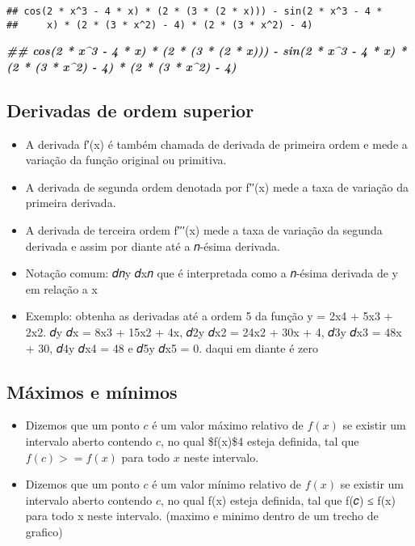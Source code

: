 \documentclass[
]{article}
\newenvironment{Shaded}{\begin{snugshade}}{\end{snugshade}}
\newcommand{\DocumentationTok}[1]{\textcolor[rgb]{0.56,0.35,0.01}{\textbf{\textit{#1}}}}
\providecommand{\tightlist}{%
  \setlength{\itemsep}{0pt}\setlength{\parskip}{0pt}}
\begin{document}
\begin{verbatim}
## cos(2 * x^3 - 4 * x) * (2 * (3 * (2 * x))) - sin(2 * x^3 - 4 * 
##     x) * (2 * (3 * x^2) - 4) * (2 * (3 * x^2) - 4)
\end{verbatim}

\begin{Shaded}
\begin{Highlighting}[]
\DocumentationTok{\#\# cos(2 * x\^{}3 {-} 4 * x) * (2 * (3 * (2 * x))) {-} sin(2 * x\^{}3 {-} 4 * x) * (2 * (3 * x\^{}2) {-} 4) * (2 * (3 * x\^{}2) {-} 4)}
\end{Highlighting}
\end{Shaded}

\hypertarget{derivadas-de-ordem-superior}{%
\subsection{Derivadas de ordem
superior}\label{derivadas-de-ordem-superior}}

\begin{itemize}
\tightlist
\item
  A derivada f′(x) é também chamada de derivada de primeira ordem e mede
  a variação da função original ou primitiva.
\item
  A derivada de segunda ordem denotada por f′′(x) mede a taxa de
  variação da primeira derivada.
\item
  A derivada de terceira ordem f′′′(x) mede a taxa de variação da
  segunda derivada e assim por diante até a 𝑛-ésima derivada.
\item
  Notação comum: 𝑑𝑛y 𝑑x𝑛 que é interpretada como a 𝑛-ésima derivada de y
  em relação a x
\item
  Exemplo: obtenha as derivadas até a ordem 5 da função y = 2x4 + 5x3 +
  2x2. 𝑑y 𝑑x = 8x3 + 15x2 + 4x, 𝑑2y 𝑑x2 = 24x2 + 30x + 4, 𝑑3y 𝑑x3 = 48x
  + 30, 𝑑4y 𝑑x4 = 48 e 𝑑5y 𝑑x5 = 0. daqui em diante é zero
\end{itemize}

\hypertarget{muxe1ximos-e-muxednimos}{%
\subsection{Máximos e mínimos}\label{muxe1ximos-e-muxednimos}}

\begin{itemize}
\tightlist
\item
  Dizemos que um ponto \(c\) é um valor máximo relativo de \(f(x)\) se
  existir um intervalo aberto contendo \(c\), no qual \$f(x)\$4 esteja
  definida, tal que \(f(c) >= f(x)\) para todo \(x\) neste intervalo.
\item
  Dizemos que um ponto \(c\) é um valor mínimo relativo de \(f(x)\) se
  existir um intervalo aberto contendo \(c\), no qual f(x) esteja
  definida, tal que f(𝑐) ≤ f(x) para todo x neste intervalo. (maximo e
  minimo dentro de um trecho de grafico)
\end{itemize}
\end{document}
